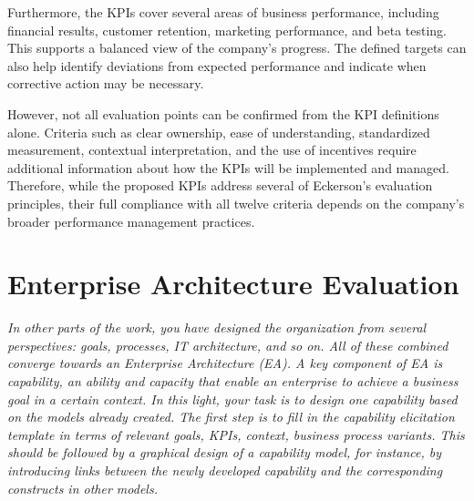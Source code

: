 \documentclass{article}
\begin{document}
Furthermore, the KPIs cover several areas of business performance, including financial results, customer retention, marketing performance, and beta testing. This supports a balanced view of the company's progress. The defined targets can also help identify deviations from expected performance and indicate when corrective action may be necessary.

However, not all evaluation points can be confirmed from the KPI definitions alone. Criteria such as clear ownership, ease of understanding, standardized measurement, contextual interpretation, and the use of incentives require additional information about how the KPIs will be implemented and managed. Therefore, while the proposed KPIs address several of Eckerson's evaluation principles, their full compliance with all twelve criteria depends on the company's broader performance management practices.

\section{Enterprise Architecture Evaluation}
\textit{
In other parts of the work, you have designed the organization from several perspectives: goals, processes, IT architecture, and so on. All of these combined converge towards an Enterprise Architecture (EA). A key component of EA is capability, an ability and capacity that enable an enterprise to achieve a business goal in a certain context. In this light, your task is to design one capability based on the models already created. The first step is to fill in the capability elicitation template in terms of relevant goals, KPIs, context, business process variants. This should be followed by a graphical design of a capability model, for instance, by introducing links between the newly developed capability and the corresponding constructs in other models.
}

\renewcommand{\arraystretch}{1.4}
\setlength{\LTpre}{0pt}
\setlength{\LTpost}{0pt}
\end{document}
